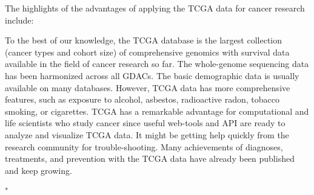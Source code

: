 \documentclass[preprint,12pt]{elsarticle}
\newenvironment{MyColorPar}[1]{%
    \leavevmode\color{#1}\ignorespaces%
}{%
}%
\begin{document}
\begin{MyColorPar}{blue}

The highlights of the advantages of applying the TCGA data for cancer research include:
\begin{outline}
\1  To the best of our knowledge, the TCGA database is the largest collection (cancer types and cohort size) of comprehensive genomics with survival data available in the field of cancer research so far. The whole-genome sequencing data has been harmonized across all GDACs. The basic demographic data is usually available on many databases. However, TCGA data has more comprehensive features, such as exposure to alcohol, asbestos, radioactive radon, tobacco smoking, or cigarettes.
\1  TCGA has a remarkable advantage for computational and life scientists who study cancer since useful web-tools and API are ready to analyze and visualize TCGA data. It might be getting help quickly from the research community for trouble-shooting.
\1  Many achievements of diagnoses, treatments, and prevention with the TCGA data have already been published and keep growing.\cite{Tomczak2015}
\end{outline}"







\end{MyColorPar}
\pagebreak
\end{document}
